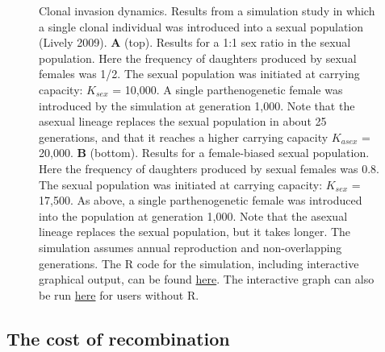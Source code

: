 \documentclass[
  letterpaper,
]{book}
\begin{document}
\begin{figure}
\caption[Clonal invasion dynamics]{\label{fig-1.2}Clonal invasion
dynamics. Results from a simulation study in which a single clonal
individual was introduced into a sexual population (Lively 2009).
\textbf{A} (top). Results for a 1:1 sex ratio in the sexual population.
Here the frequency of daughters produced by sexual females was 1/2. The
sexual population was initiated at carrying capacity: \(K_{sex}\) =
10,000. A single parthenogenetic female was introduced by the simulation
at generation 1,000. Note that the asexual lineage replaces the sexual
population in about 25 generations, and that it reaches a higher
carrying capacity \(K_{asex}\) = 20,000. \textbf{B} (bottom). Results
for a female-biased sexual population. Here the frequency of daughters
produced by sexual females was 0.8. The sexual population was initiated
at carrying capacity: \(K_{sex}\) = 17,500. As above, a single
parthenogenetic female was introduced into the population at generation
1,000. Note that the asexual lineage replaces the sexual population, but
it takes longer. The simulation assumes annual reproduction and
non-overlapping generations. The R code for the simulation, including
interactive graphical output, can be found
\href{https://raw.githubusercontent.com/IULibScholComm/through-the-looking-glass/main/sim\%20for\%20fig\%201.2(ZMD).R}{here}.
The interactive graph can also be run
\href{https://connect.posit.iu.edu/clonal-invasion-dynamics/}{here} for
users without R.}

\end{figure}%

\subsection{The cost of recombination}\label{the-cost-of-recombination}
\end{document}
